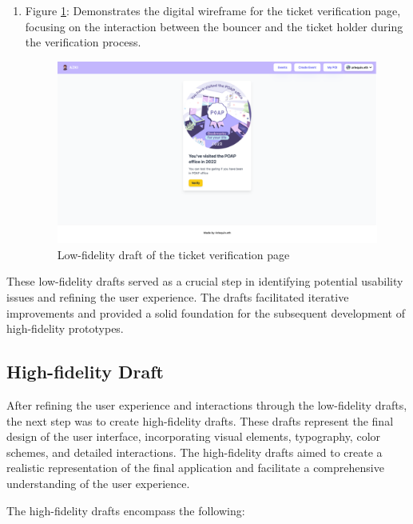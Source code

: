 \begin{enumerate}
\item Figure \ref{Abb10}: Demonstrates the digital wireframe for the ticket verification page, focusing on the interaction between the bouncer and the ticket holder during the verification process.\\
\begin{figure}[H]
\centering
\includegraphics[width=0.5\linewidth]{PICs/LowFiVerification.png}
\caption{Low-fidelity draft of the ticket verification page}\label{Abb10}
\end{figure}
\end{enumerate}

These low-fidelity drafts served as a crucial step in identifying potential usability issues and refining the user experience. The drafts facilitated iterative improvements and provided a solid foundation for the subsequent development of high-fidelity prototypes.

\subsection{High-fidelity Draft}

After refining the user experience and interactions through the low-fidelity drafts, the next step was to create high-fidelity drafts. These drafts represent the final design of the user interface, incorporating visual elements, typography, color schemes, and detailed interactions. The high-fidelity drafts aimed to create a realistic representation of the final application and facilitate a comprehensive understanding of the user experience.

The high-fidelity drafts encompass the following:

